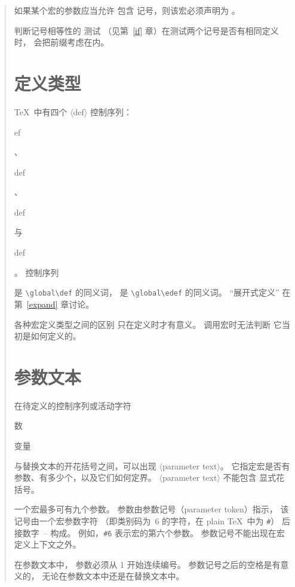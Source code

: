 \documentclass[a4paper]{rapport3}
\makeatletter
\def\gr#1{$\langle$#1$\rangle$}\def\key#1{{\tt#1}}
\def\alt{}\def\altt{}%
\newenvironment{disp}{\begin{quotation}}{\end{quotation}}
\def\term#1\par{\index{#1}}
\def\cstoidx#1\par{\index{#1@\cs{#1}}}
\def\csidx#1{\cstoidx #1\par\cs{#1}}
\makeatother
\begin{document}
\begin{disp}
\begin{description}
如果某个宏的参数应当允许
包含  记号，则该宏必须声明为
。 \end{description}

判断记号相等性的  测试
（见第~\ref{if} 章）在测试两个记号是否有相同定义时，
会把前缀考虑在内。

\section{定义类型}

\TeX\ 中有四个 \gr{def} 控制序列：
\csidx{def}、\csidx{gdef}、\csidx{edef} 与 \csidx{xdef}。
控制序列
\alt
{} 是 \verb>\global\def> 的同义词，
 是 \verb>\global\edef> 的同义词。
“展开式定义” 在
第~\ref{expand} 章讨论。

各种宏定义类型之间的区别
只在定义时才有意义。
调用宏时无法判断
它当初是如何定义的。

\section{参数文本}
\label{param:text}

在待定义的控制序列或活动字符
\term 参数\par\term 自变量\par
与替换文本的开花括号之间，可以出现 \gr{parameter text}。
它指定宏是否有参数、有多少个，以及它们如何定界。
\gr{parameter text} 不能包含
显式花括号。

一个宏最多可有九个参数。
参数由参数记号（parameter token）指示，
该记号由一个宏参数字符
（即类别码为~6 的字符，在 plain \TeX\ 中为 \verb=#=）
后接数字~-- 构成。
例如，\verb>#6> 表示宏的第六个参数。
参数记号不能出现在宏定义上下文之外。

在参数文本中，
参数必须从 1 开始连续编号。
参数记号之后的空格是有意义的，
无论在参数文本中还是在替换文本中。


\end{disp}
\end{document}
